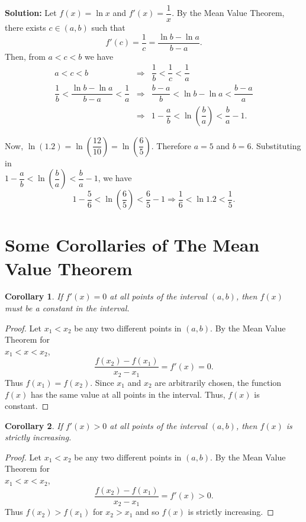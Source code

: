 \documentclass[titlepage,a4paper,12pt]{report}
\newtheorem{corollary}{Corollary}[section]
\begin{document}
 \noindent \textbf{Solution:} Let $f(x)=\ln x$ and $f'(x)=\dfrac{1}{x}$. By the Mean Value Theorem, there exists $c\in (a,b)$ such that 
 \begin{equation*}
f'(c)=\dfrac{1}{c}=\dfrac{\ln b -\ln a}{b-a}. 
 \end{equation*}
 Then, from $a<c<b$ we have
 \begin{eqnarray*}
 a<c<b  &\Longrightarrow & \dfrac{1}{b}< \dfrac{1}{c} <\dfrac{1}{a} \\
 \dfrac{1}{b} <\dfrac{\ln b -\ln a}{b-a} <\dfrac{1}{a} &\Longrightarrow & \dfrac{b-a}{b}<\ln b -\ln a < \dfrac{b-a}{a}\\
 &\Longrightarrow & 1-\dfrac{a}{b}<\ln \left(\dfrac{b}{a}\right)<\dfrac{b}{a}-1.
 \end{eqnarray*}
 
\noindent Now, $\ln (1.2)=\ln \left(\dfrac{12}{10}\right)=\ln \left(\dfrac{6}{5} \right)$. Therefore $a=5$ and $b=6$. Substituting in \\$1-\dfrac{a}{b}<\ln \left(\dfrac{b}{a}\right)<\dfrac{b}{a}-1$, we have 
\begin{equation*}
1-\dfrac{5}{6}<\ln \left(\dfrac{6}{5}\right)<\dfrac{6}{5}-1 \Longrightarrow \dfrac{1}{6}<\ln 1.2 < \dfrac{1}{5}.
\end{equation*}
\section{Some Corollaries of The Mean Value Theorem}
\begin{corollary}
If $f'(x)=0$ at all points of the interval $(a,b)$, then $f(x)$ must be a constant in the interval.
\end{corollary}
\begin{proof}
Let $x_1<x_2$ be any two different points in $(a,b)$. By the Mean Value Theorem for\\
 $x_1<x<x_2$, 
\begin{equation*}
\dfrac{f(x_2)-f(x_1)}{x_2-x_1} =f'(x)=0.
\end{equation*} 
Thus $f(x_1)=f(x_2)$. Since $x_1$ and $x_2$ are arbitrarily chosen, the function $f(x)$ has the same value at all points in the interval. Thus, $f(x)$ is constant.
\end{proof}
\begin{corollary}
If $f'(x)>0$ at all points of the interval $(a,b)$, then $f(x)$ is strictly increasing.
\end{corollary}
\begin{proof}
Let $x_1<x_2$ be any two different points in $(a,b)$. By the Mean Value Theorem for\\ $x_1<x<x_2$, 
\begin{equation*}
\dfrac{f(x_2)-f(x_1)}{x_2-x_1} =f'(x)>0.
\end{equation*}
Thus $f(x_2)>f(x_1)$ for $x_2>x_1$ and so $f(x)$ is strictly increasing.
\end{proof}
\end{document}
